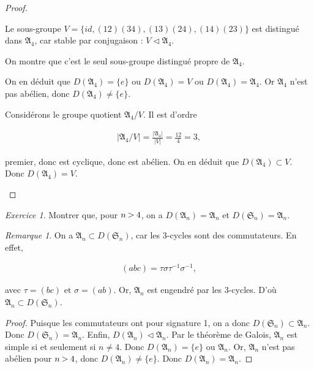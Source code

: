 \documentclass[french]{book}
\theoremstyle{definition}
\theoremstyle{remark}
\newtheorem*{remark}{Remarque}
\newtheorem{exo}{Exercice}
\newcommand{\biggg}{\rotatebox[origin=c]{90}{$\lor$}}
\newcommand{\bg}{\ \biggg\ }
\begin{document}
\begin{proof}
\begin{enumerate}
    Le sous-groupe \(V = \{ id,  (1 2)(3 4), (1 3)(2 4), (1 4) (2 3)\}\) est distingué dans \(\mathfrak{A}_4\), car stable par conjugaison : \(V \triangleleft \mathfrak{A}_4\).

    On montre que c'est le seul sous-groupe distingué propre de \(\mathfrak{A}_4\).

    On en déduit que \(D(\mathfrak{A}_4) = \{ e \}\) ou \(D(\mathfrak{A}_4) = V\) ou \(D(\mathfrak{A}_4) = \mathfrak{A}_4\). Or \(\mathfrak{A}_4\) n'est pas abélien, donc \(D(\mathfrak{A}_4) \neq \{ e \}\).

    Considérons le groupe quotient \(\mathfrak{A}_4 / V\). Il est d'ordre

    \begin{gather*}
      \left\lvert \mathfrak{A}_4/V \right\rvert = \frac{\left\lvert \mathfrak{A}_4 \right\rvert}{\left\lvert V \right\rvert} = \frac{12}{4}= 3,
    \end{gather*}

    premier, donc est cyclique, donc est abélien. On en déduit que \(D(\mathfrak{A}_4) \subset V\). Donc \(D(\mathfrak{A}_4) = V\).
  \end{enumerate}
\end{proof}

\begin{exo}
  Montrer que, pour \(n \bg 4\), on a \(D(\mathfrak{A}_n) = \mathfrak{A}_n\) et \(D(\mathfrak{S}_n) = \mathfrak{A}_n\).
\end{exo}

\begin{remark}
  On a \(\mathfrak{A}_n \subset D(\mathfrak{S}_n)\), car les 3-cycles sont des commutateurs. En effet,

  \begin{gather*}
    (a b c) = \tau \sigma \tau ^{-1} \sigma ^{-1},
  \end{gather*}

  avec \(\tau = (bc) \text{ et } \sigma = (a b)\). Or, \(\mathfrak{A}_n\) est engendré par les 3-cycles. D'où \(\mathfrak{A}_n \subset D(\mathfrak{S}_n)\).
\end{remark}

\begin{proof}
  Puisque les commutateurs ont pour signature 1, on a donc \(D(\mathfrak{S}_{n}) \subset \mathfrak{A}_n\). Donc \(D(\mathfrak{S}_n) = \mathfrak{A}_n\). Enfin, \(D(\mathfrak{A}_n) \triangleleft \mathfrak{A}_n\). Par le théorème de Galois, \(\mathfrak{A}_n\) est simple si et seulement si \(n \neq 4\). Donc \(D(\mathfrak{A}_n) = \{ e \}\) ou \(\mathfrak{A}_n\). Or, \(\mathfrak{A}_n\) n'est pas abélien pour \(n \bg 4\), donc \(D(\mathfrak{A}_n) \neq \{ e \}\). Donc \(D(\mathfrak{A}_n) =\mathfrak{A}_n\).
\end{proof}
\end{document}
